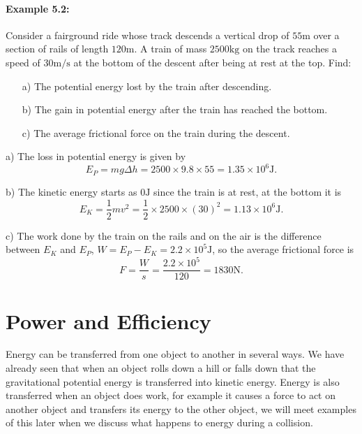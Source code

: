 \documentclass[a4paper,12pt]{book}
\begin{document}
\paragraph{Example 5.2:} Consider a fairground ride whose track descends a vertical drop of $55\text{m}$ over a section of rails of length $120\text{m}$. A train of mass $2500\text{kg}$ on the track reaches a speed of $30\text{m/s}$ at the bottom of the descent after being at rest at the top. Find:
\begin{itemize}
\setlength{\itemsep}{-5pt}
    \item[a)] The potential energy lost by the train after descending.
    \item[b)] The gain in potential energy after the train has reached the bottom.
    \item[c)] The average frictional force on the train during the descent.
\end{itemize} 
a) The loss in potential energy is given by
\begin{equation*}
E_{P}=mg\Delta h=2500\times 9.8\times 55=1.35\times 10^{6}\text{J}.
\end{equation*}

b) The kinetic energy starts as $0\text{J}$ since the train is at rest, at the bottom it is
\begin{equation*}
E_{K}=\frac{1}{2}mv^{2}=\frac{1}{2}\times 2500\times (30)^{2}=1.13\times 10^{6}\text{J}.
\end{equation*}

c) The work done by the train on the rails and on the air is the difference between $E_{K}$ and $E_{P}$, $W=E_{P}-E_{K}=2.2\times 10^{5}\text{J}$, so the average frictional force is
\begin{equation*}
F=\frac{W}{s}=\frac{2.2\times 10^{5}}{120}=1830\text{N}.
\end{equation*}

\section{Power and Efficiency}
Energy can be transferred from one object to another in several ways. We have already seen that when an object rolls down a hill or falls down that the gravitational potential energy is transferred into kinetic energy. Energy is also transferred when an object does work, for example it causes a force to act on another object and transfers its energy to the other object, we will meet examples of this later when we discuss what happens to energy during a collision.\\
\end{document}
